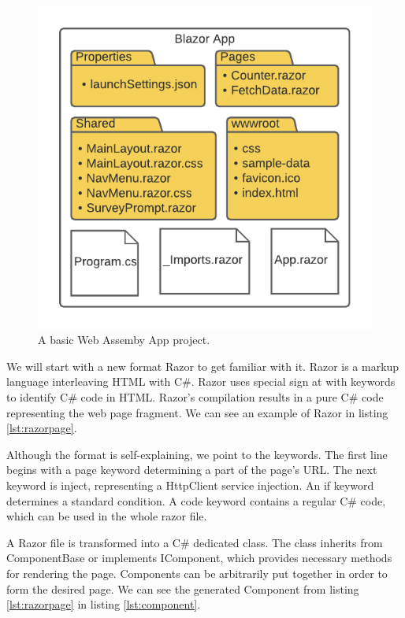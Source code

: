 \begin{figure}[H]\centering
\includegraphics{./img/ProjectStructure}
\caption{A basic Web Assemby App project.}
\label{img01:project}
\end{figure} 
\par
We will start with a new format Razor to get familiar with it.
Razor is a markup language interleaving HTML with C\#.
Razor uses special sign at with keywords to identify C\# code in HTML.
Razor's compilation results in a pure C\# code representing the web page fragment.
We can see an example of Razor in listing \ref{lst:razorpage}.
\par
Although the format is self-explaining, we point to the keywords.
The first line begins with a page keyword determining a part of the page's URL.
The next keyword is inject, representing a HttpClient service injection. 
An if keyword determines a standard condition.
A code keyword contains a regular C\# code, which can be used in the whole razor file.
\par
A Razor file is transformed into a C\# dedicated class.
The class inherits from ComponentBase or implements IComponent, which provides necessary methods for rendering the page.
Components can be arbitrarily put together in order to form the desired page.
We can see the generated Component from listing \ref{lst:razorpage} in listing \ref{lst:component}.
\par
